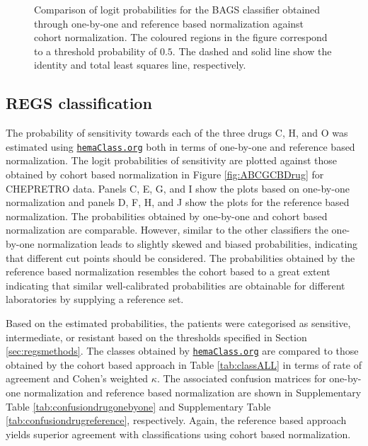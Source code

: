 \documentclass[10pt,letterpaper]{article}
\newcommand{\hemaClass}{\href{http://hemaClass.org}{\texttt{hemaClass.org}}}
\begin{document}
\begin{figure}[!ht]
\caption{
Comparison of logit probabilities for the BAGS classifier obtained through one-by-one and reference based normalization against cohort normalization.
The coloured regions in the figure correspond to a threshold probability of $0.5$.
The dashed and solid line show the identity and total least squares line, respectively.
}
\label{fig:Bagscorr}
\end{figure}



\subsection*{REGS classification}
The probability of sensitivity towards each of the three drugs C, H, and O was estimated using \hemaClass{} both in terms of one-by-one and reference based normalization.
The logit probabilities of sensitivity are plotted against those obtained by cohort based normalization in Figure \ref{fig:ABCGCBDrug} for CHEPRETRO data.
Panels C, E, G, and I show the plots based on one-by-one normalization and panels D, F, H, and J show the plots for the reference based normalization.
The probabilities obtained by one-by-one and cohort based normalization are comparable. However, similar to the other classifiers the one-by-one normalization leads to slightly skewed and biased probabilities, indicating that different cut points should be considered.
The probabilities obtained by the reference based normalization resembles the cohort based to a great extent indicating that similar well-calibrated probabilities are obtainable for different laboratories by supplying a reference set.

Based on the estimated probabilities, the patients were categorised as sensitive, intermediate, or resistant based on the thresholds specified in Section \ref{sec:regsmethods}.
The classes obtained by \hemaClass{} are compared to those obtained by the cohort based approach in Table \ref{tab:classALL} in terms of rate of agreement and Cohen's weighted $\kappa$.
The associated confusion matrices for one-by-one normalization and reference based normalization are shown in
Supplementary Table \ref{tab:confusiondrugonebyone} and
Supplementary Table \ref{tab:confusiondrugreference}, respectively.
Again, the reference based approach yields superior agreement with classifications using cohort based normalization.
\end{document}
